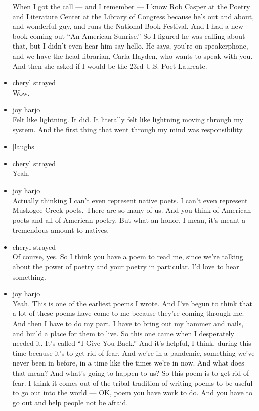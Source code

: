 \begin{itemize}
  When I got the call --- and I remember --- I know Rob Casper at the
  Poetry and Literature Center at the Library of Congress because he's
  out and about, and wonderful guy, and runs the National Book Festival.
  And I had a new book coming out ``An American Sunrise.'' So I figured
  he was calling about that, but I didn't even hear him say hello. He
  says, you're on speakerphone, and we have the head librarian, Carla
  Hayden, who wants to speak with you. And then she asked if I would be
  the 23rd U.S. Poet Laureate.
\item
  cheryl strayed\\
  Wow.
\item
  joy harjo\\
  Felt like lightning. It did. It literally felt like lightning moving
  through my system. And the first thing that went through my mind was
  responsibility.
\item
  {[}laughs{]}
\item
  cheryl strayed\\
  Yeah.
\item
  joy harjo\\
  Actually thinking I can't even represent native poets. I can't even
  represent Muskogee Creek poets. There are so many of us. And you think
  of American poets and all of American poetry. But what an honor. I
  mean, it's meant a tremendous amount to natives.
\item
  cheryl strayed\\
  Of course, yes. So I think you have a poem to read me, since we're
  talking about the power of poetry and your poetry in particular. I'd
  love to hear something.
\item
  joy harjo\\
  Yeah. This is one of the earliest poems I wrote. And I've begun to
  think that a lot of these poems have come to me because they're coming
  through me. And then I have to do my part. I have to bring out my
  hammer and nails, and build a place for them to live. So this one came
  when I desperately needed it. It's called ``I Give You Back.'' And
  it's helpful, I think, during this time because it's to get rid of
  fear. And we're in a pandemic, something we've never been in before,
  in a time like the times we're in now. And what does that mean? And
  what's going to happen to us? So this poem is to get rid of fear. I
  think it comes out of the tribal tradition of writing poems to be
  useful to go out into the world --- OK, poem you have work to do. And
  you have to go out and help people not be afraid.

\end{itemize}
